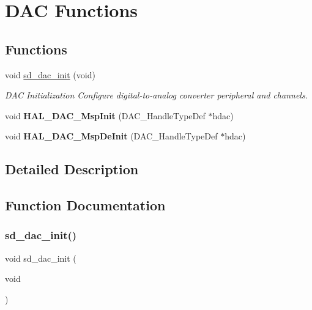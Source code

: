 \hypertarget{group___s_d___d_a_c___functions}{}\section{D\+AC Functions}
\label{group___s_d___d_a_c___functions}
\subsection*{Functions}
\begin{DoxyCompactItemize}
\item 
void \mbox{\hyperlink{group___s_d___d_a_c___functions_gadb857b0938b79cf9ba37b3bcb5a530ae}{sd\+\_\+dac\+\_\+init}} (void)
\begin{DoxyCompactList}\small\item\em D\+AC Initialization Configure digital-\/to-\/analog converter peripheral and channels. \end{DoxyCompactList}\item 
\mbox{\label{group___s_d___d_a_c___functions_gacd409f887681168e93817e8a5485d74b}} 
void {\bfseries H\+A\+L\+\_\+\+D\+A\+C\+\_\+\+Msp\+Init} (D\+A\+C\+\_\+\+Handle\+Type\+Def $\ast$hdac)
\item 
\mbox{\label{group___s_d___d_a_c___functions_ga4caf761f179e82f99674ef63643340f3}} 
void {\bfseries H\+A\+L\+\_\+\+D\+A\+C\+\_\+\+Msp\+De\+Init} (D\+A\+C\+\_\+\+Handle\+Type\+Def $\ast$hdac)
\end{DoxyCompactItemize}


\subsection{Detailed Description}


\subsection{Function Documentation}
\mbox{\label{group___s_d___d_a_c___functions_gadb857b0938b79cf9ba37b3bcb5a530ae}} 
\subsubsection{\texorpdfstring{sd\+\_\+dac\+\_\+init()}{sd\_dac\_init()}}
{\footnotesize\ttfamily void sd\+\_\+dac\+\_\+init (\begin{DoxyParamCaption}\item[{void}]{ }\end{DoxyParamCaption})}



